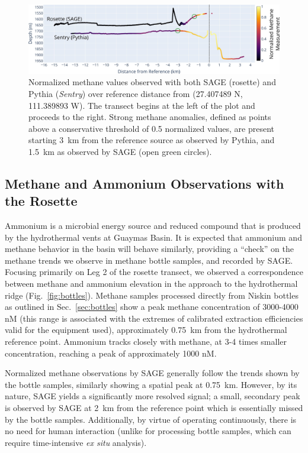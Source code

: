 \begin{figure}[h!]
    \centering
    \includegraphics[width=1\columnwidth]{figures/chap3_methane_over_distance.jpg}
    \caption[Methane observations during transect]{Normalized methane values observed with both SAGE (rosette) and Pythia (\emph{Sentry}) over reference distance from (27.407489 N, 111.389893 W). The transect begins at the left of the plot and proceeds to the right. Strong methane anomalies, defined as points above a conservative threshold of 0.5 normalized values, are present starting \SI{3}{\kilo\meter} from the reference source as observed by Pythia, and \SI{1.5}{\kilo\meter} as observed by SAGE (open green circles).}
    \label{fig:methane_distance}
\end{figure}


\subsection{Methane and Ammonium Observations with the Rosette}
Ammonium is a microbial energy source and reduced compound that is produced by the hydrothermal vents at Guaymas Basin. It is expected that ammonium and methane behavior in the basin will behave similarly, providing a ``check'' on the methane trends we observe in methane bottle samples, and recorded by SAGE. Focusing primarily on Leg 2 of the rosette transect, we observed a correspondence between methane and ammonium elevation in the approach to the hydrothermal ridge (Fig.~\ref{fig:bottles}). Methane samples processed directly from Niskin bottles as outlined in Sec.~\ref{sec:bottles} show a peak methane concentration of 3000-4000 nM (this range is associated with the extremes of calibrated extraction efficiencies valid for the equipment used), approximately \SI{0.75}{\kilo\meter} from the hydrothermal reference point. Ammonium tracks closely with methane, at 3-4 times smaller concentration, reaching a peak of approximately 1000 nM. 

Normalized methane observations by SAGE generally follow the trends shown by the bottle samples, similarly showing a spatial peak at \SI{0.75}{\kilo\meter}. However, by its nature, SAGE yields a significantly more resolved signal; a small, secondary peak is observed by SAGE at \SI{2}{\kilo\meter} from the reference point which is essentially missed by the bottle samples. Additionally, by virtue of operating continuously, there is no need for human interaction (unlike for processing bottle samples, which can require time-intensive \emph{ex situ} analysis). 

